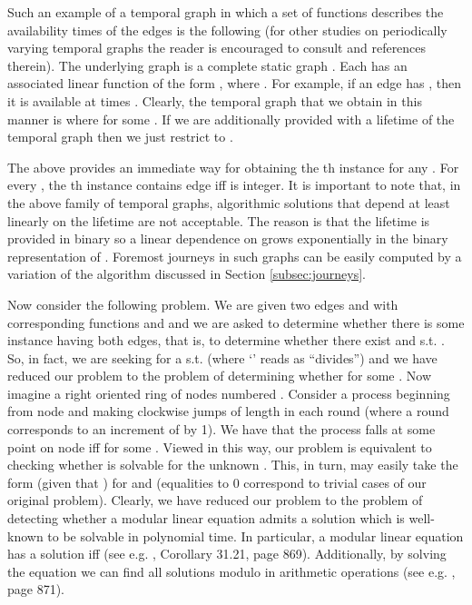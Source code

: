 \documentclass[oribibl, 11pt]{llncs}
\begin{document}
Such an example of a temporal graph in which a set of functions describes the availability times of the edges is the following (for other studies on periodically varying temporal graphs the reader is encouraged to consult \cite{Or81,FMS09,CFQS12} and references therein). The underlying graph is a complete static graph . Each  has an associated linear function of the form , where . For example, if an edge  has , then it is available at times . Clearly, the temporal graph that we obtain in this manner is  where  for some . If we are additionally provided with a lifetime  of the temporal graph then we just restrict  to .

The above provides an immediate way for obtaining the th instance for any . For every , the th instance contains edge  iff  is integer. It is important to note that, in the above family of temporal graphs, algorithmic solutions that depend at least linearly on the lifetime  are not acceptable. The reason is that the lifetime  is provided in binary so a linear dependence on  grows exponentially in the binary representation of . Foremost journeys in such graphs can be easily computed by a variation of the algorithm discussed in Section \ref{subsec:journeys}.

Now consider the following problem. We are given two edges  and  with corresponding functions  and  and we are asked to determine whether there is some instance having both edges, that is, to determine whether there exist  and  s.t.   . So, in fact, we are seeking for a  s.t.  (where `' reads as ``divides'') and we have reduced our problem to the problem of determining whether  for some . Now imagine a right oriented ring of  nodes numbered . Consider a process beginning from node  and making clockwise jumps of length  in each round (where a round corresponds to an increment of  by 1). We have that the process falls at some point on node  iff  for some . Viewed in this way, our problem is equivalent to checking whether  is solvable for the unknown . This, in turn, may easily take the form  (given that ) for  and  (equalities to 0 correspond to trivial cases of our original problem). Clearly, we have reduced our problem to the problem of detecting whether a modular linear equation admits a solution which is well-known to be solvable in polynomial time. In particular, a modular linear equation  has a solution iff  (see e.g. \cite{CLRS01}, Corollary 31.21, page 869). Additionally, by solving the equation we can find all solutions modulo  in  arithmetic operations (see e.g. \cite{CLRS01}, page 871).
\end{document}

